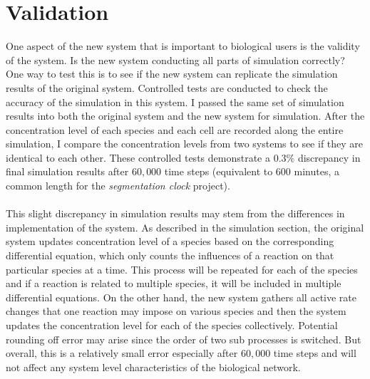 \documentclass[../thesis.tex]{subfiles}
\begin{document}
\chapter{Validation}
\label{ch:Validation}
One aspect of the new system that is important to biological users is the validity of the system. Is the new system conducting all parts of simulation correctly? One way to test this is to see if the new system can replicate the simulation results of the original system. Controlled tests are conducted to check the accuracy of the simulation in this system. I passed the same set of simulation results into both the original system and the new system for simulation. After the concentration level of each species and each cell are recorded along the entire simulation, I compare the concentration levels from two systems to see if they are identical to each other. These controlled tests demonstrate a $0.3\%$ discrepancy in final simulation results after $60,000$ time steps (equivalent to $600$ minutes, a common length for the \textit{segmentation clock} project). \\
\\
 This slight discrepancy in simulation results may stem from the differences in implementation of the system. As described in the simulation section, the original system updates concentration level of a species based on the corresponding differential equation, which only counts the influences of a reaction on that particular species at a time. This process will be repeated for each of the species and if a reaction is related to multiple species, it will be included in multiple differential equations. On the other hand, the new system gathers all active rate changes that one reaction may impose on various species and then the system updates the concentration level for each of the species collectively. Potential rounding off error may arise since the order of two sub processes is switched. But overall, this is a relatively small error especially after $60,000$ time steps and will not affect any system level characteristics of the biological network.
\end{document}
